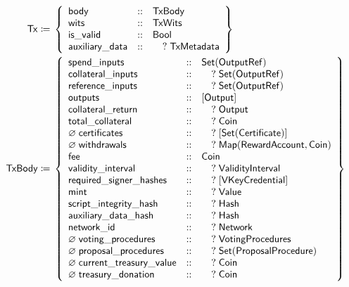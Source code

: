 \documentclass[../hydrozoa.tex]{subfiles}
\begin{document}
\begin{align*}
    \T{Tx} \coloneq\;& \left\{
    \begin{array}{lll}
      \T{body} &::& \T{TxBody} \\
        \T{wits} &::& \T{TxWits} \\
        \T{is\_valid} &::& \T{Bool} \\
        \T{auxiliary\_data} &::& \quad?\;\T{TxMetadata}
    \end{array} \right\} \\
    \T{TxBody} \coloneq\;& \left\{
    \begin{array}{lll}
      \T{spend\_inputs} &::& \T{Set(OutputRef)} \\
        \T{collateral\_inputs} &::& \quad?\;\T{Set(OutputRef)} \\
        \T{reference\_inputs} &::& \quad?\;\T{Set(OutputRef)} \\
        \T{outputs} &::& \T{[Output]} \\
        \T{collateral\_return} &::& \quad?\;\T{Output} \\
        \T{total\_collateral} &::& \quad?\;\T{Coin} \\
        \varnothing\;\T{certificates} &::& \quad?\;\T{[ Set(Certificate) ]} \\
        \varnothing\;\T{withdrawals} &::& \quad?\;\T{Map(RewardAccount, Coin)} \\
        \T{fee} &::& \T{Coin} \\
        \T{validity\_interval} &::& \quad?\;\T{ValidityInterval} \\
        \T{required\_signer\_hashes} &::& \quad?\;\T{[VKeyCredential]} \\
        \T{mint} &::& \quad?\;\T{Value} \\
        \T{script\_integrity\_hash} &::& \quad?\;\T{Hash} \\
        \T{auxiliary\_data\_hash} &::& \quad?\;\T{Hash} \\
        \T{network\_id} &::& \quad?\;\T{Network} \\
        \varnothing\;\T{voting\_procedures} &::& \quad?\;\T{VotingProcedures} \\
        \varnothing\;\T{proposal\_procedures} &::& \quad?\;\T{Set(ProposalProcedure)} \\
        \varnothing\;\T{current\_treasury\_value} &::& \quad?\;\T{Coin} \\
        \varnothing\;\T{treasury\_donation} &::& \quad?\;\T{Coin}
    \end{array} \right\}\\

\end{align*}
\end{document}
